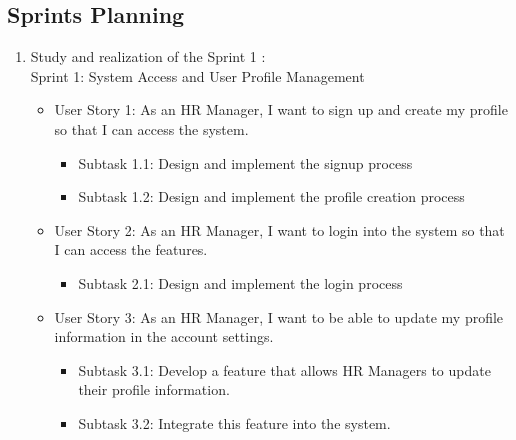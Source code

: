 \subsection{Sprints Planning}
\begin{enumerate}
    \item Study and realization of the Sprint 1 : \\
          Sprint 1: System Access and User Profile Management
          \begin{itemize}
              \renewcommand\labelitemi{-}
              \item User Story 1: As an HR Manager, I want to sign up and create my profile so that I can access the system. \\
                    \begin{itemize}
                        \item Subtask 1.1: Design and implement the signup process
                        \item Subtask 1.2: Design and implement the profile creation process
                    \end{itemize}
              \item User Story 2: As an HR Manager, I want to login into the system so that I can access the features. \\
                    \begin{itemize}
                        \item Subtask 2.1: Design and implement the login process
                    \end{itemize}
              \item User Story 3: As an HR Manager, I want to be able to update my profile information in the account settings. \\
                    \begin{itemize}
                        \item Subtask 3.1: Develop a feature that allows HR Managers to update their profile information.
                        \item Subtask 3.2: Integrate this feature into the system.
                    \end{itemize}
          \end{itemize}
          

\end{enumerate}
